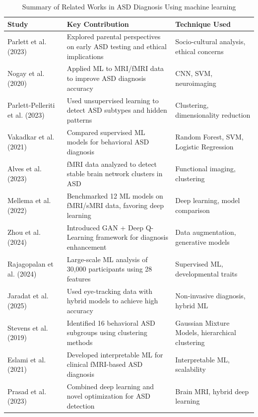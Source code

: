 \documentclass[pdflatex,sn-nature]{sn-jnl}
\theoremstyle{thmstyleone}%
\theoremstyle{thmstyletwo}%
\theoremstyle{thmstylethree}%
\begin{document}
\begin{table}[ht]
\centering
\caption{Summary of Related Works in ASD Diagnosis Using machine learning}
\label{tab:relatedworks}
\begin{tabularx}{\textwidth}{|p{3.2cm}|X|p{2.8cm}|} %
\hline
\textbf{Study} & \textbf{Key Contribution} & \textbf{Technique Used} \\
\hline
Parlett et al. (2023) \cite{parlett2023applications} & Explored parental perspectives on early ASD testing and ethical implications & Socio-cultural analysis, ethical concerns \\
\hline
Nogay et al. (2020) \cite{nogay2020machine} & Applied ML to MRI/fMRI data to improve ASD diagnosis accuracy & CNN, SVM, neuroimaging \\
\hline
Parlett-Pelleriti et al. (2023) \cite{parlett2023applications} & Used unsupervised learning to detect ASD subtypes and hidden patterns & Clustering, dimensionality reduction \\
\hline
Vakadkar et al. (2021) \cite{bib4} & Compared supervised ML models for behavioral ASD diagnosis & Random Forest, SVM, Logistic Regression \\
\hline
Alves et al. (2023) \cite{bib5} & fMRI data analyzed to detect stable brain network clusters in ASD & Functional imaging, clustering \\
\hline
Mellema et al. (2022) \cite{bib6} & Benchmarked 12 ML models on fMRI/sMRI data, favoring deep learning & Deep learning, model comparison \\
\hline
Zhou et al. (2024) \cite{bib7} & Introduced GAN + Deep Q-Learning framework for diagnosis enhancement & Data augmentation, generative models \\
\hline
Rajagopalan et al. (2024) \cite{bib8} & Large-scale ML analysis of 30,000 participants using 28 features & Supervised ML, developmental traits \\
\hline
Jaradat et al. (2025) \cite{bib10} & Used eye-tracking data with hybrid models to achieve high accuracy & Non-invasive diagnosis, hybrid ML \\
\hline
Stevens et al. (2019) \cite{bib12} & Identified 16 behavioral ASD subgroups using clustering methods & Gaussian Mixture Models, hierarchical clustering \\
\hline
Eslami et al. (2021) \cite{bib13} & Developed interpretable ML for clinical fMRI-based ASD diagnosis & Interpretable ML, scalability \\
\hline
Prasad et al. (2023) \cite{bib14} & Combined deep learning and novel optimization for ASD detection & Brain MRI, hybrid deep learning \\
\hline
\end{tabularx}
\end{table}
\end{document}

